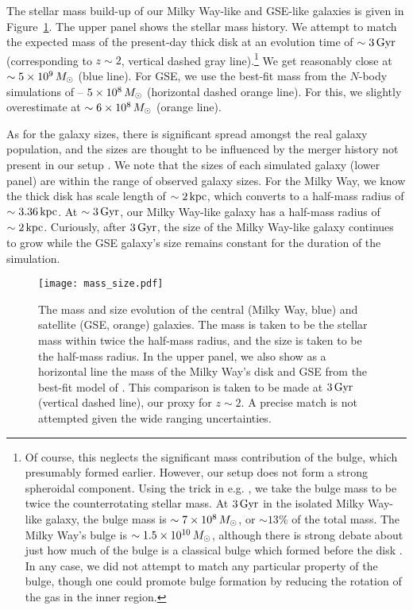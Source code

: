 The stellar mass build-up of our Milky Way-like and GSE-like galaxies is given in Figure~\ref{fig:mass_size}. The upper panel shows the stellar mass history. We attempt to match the expected mass of the present-day thick disk \citep[$\sim6\times10^9\,\Msun$, horizontal blue dashed line][]{2016ARA&A..54..529B} at an evolution time of $\sim3\,\textrm{Gyr}$ (corresponding to $z\sim2$, vertical dashed gray line).\footnote{Of course, this neglects the significant mass contribution of the bulge, which presumably formed earlier. However, our setup does not form a strong spheroidal component. Using the trick in e.g. \citet{2022MNRAS.515.1524Z}, we take the bulge mass to be twice the counterrotating stellar mass. At $3\,\textrm{Gyr}$ in the isolated Milky Way-like galaxy, the bulge mass is $\sim7\times10^{8}\,M_{\odot}$, or $\sim13\%$ of the total mass. The Milky Way's bulge is  $\sim1.5\times10^{10}\,M_{\odot}$, although there is strong debate about just how much of the bulge is a classical bulge which formed before the disk \citep{2016ARA&A..54..529B}. In any case, we did not attempt to match any particular property of the bulge, though one could promote bulge formation by reducing the rotation of the gas in the inner region.} We get reasonably close at $\sim5\times10^9\,M_{\odot}$ (blue line). For GSE, we use the best-fit mass from the $N$-body simulations of \citet{2021ApJ...923...92N} -- $5\times10^8\,M_{\odot}$ (horizontal dashed orange line). For this, we slightly overestimate at $\sim6\times10^8\,M_{\odot}$ (orange line).

As for the galaxy sizes, there is significant spread amongst the real galaxy population, and the sizes are thought to be influenced by the merger history not present in our setup \citep[e.g.][]{2014ApJ...788...28V}. We note that the sizes of each simulated galaxy (lower panel) are within the range of observed galaxy sizes. For the Milky Way, we know the thick disk has scale length of $\sim2\,\textrm{kpc}$, which converts to a half-mass radius of $\sim3.36\,\textrm{kpc}$. At $\sim3\,\textrm{Gyr}$, our Milky Way-like galaxy has a half-mass radius of $\sim2\,\textrm{kpc}$. Curiously, after $3\,\textrm{Gyr}$, the size of the Milky Way-like galaxy continues to grow while the GSE galaxy's size remains constant for the duration of the simulation.

\begin{figure}
    \centering
    \texttt{[image: mass\_size.pdf]}
    \caption{The mass and size evolution of the central (Milky Way, blue) and satellite (GSE, orange) galaxies. The mass is taken to be the stellar mass within twice the half-mass radius, and the size is taken to be the half-mass radius. In the upper panel, we also show as a horizontal line the mass of the Milky Way's disk and GSE from the best-fit model of \citet{2021ApJ...923...92N}. This comparison is taken to be made at $3\,\textrm{Gyr}$ (vertical dashed line), our proxy for $z\sim2$. A precise match is not attempted given the wide ranging uncertainties.}
    \label{fig:mass_size}
  \end{figure}

